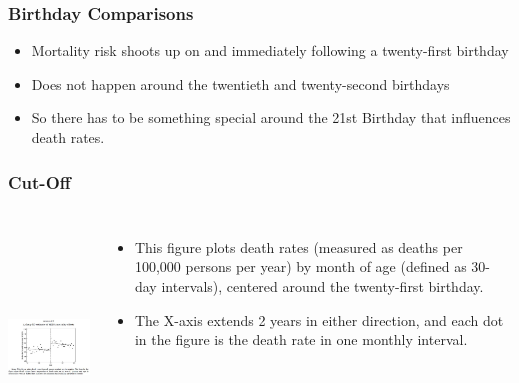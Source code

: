 \documentclass{beamer}
\begin{document}
\begin{frame}
\frametitle{Birthday Comparisons}
\begin{itemize}
\item Mortality risk shoots up on and immediately following a twenty-first birthday
\item Does not happen around the twentieth and twenty-second birthdays
\item So there has to be something special around the 21st Birthday that influences death rates.
\end{itemize}
\end{frame}
\begin{frame}
\frametitle{Cut-Off}
\begin{columns}
\includegraphics[width=6cm,height=6.5cm,keepaspectratio]{Figure 4.2} 

\begin{itemize}
	\item This figure plots death rates (measured as deaths per 100,000 persons per year) by month of age (defined as 30- day intervals), centered around the twenty-first birthday. 
	\item The X-axis extends 2 years in either direction, and each dot in the figure is the death rate in one monthly interval.
\end{itemize}

\end{columns}
\end{frame}
\end{document}
